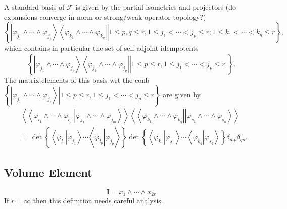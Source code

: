 \documentclass[aps,preprint]{revtex4}%
\begin{document}
A standard basis of $\mathcal{F}$ is given by the partial isometries and
projectors (do expansions converge in norm or strong/weak operator topology?)
\begin{equation}
\left\{  \left.  \left\vert \varphi_{j_{1}}\wedge\cdots\wedge\varphi_{j_{p}%
}\right\rangle \left\langle \varphi_{k_{1}}\wedge\cdots\wedge\varphi_{k_{q}%
}\right\vert \right\vert 1\leq p,q\leq r,1\leq j_{1}<\cdots<j_{p}\leq r;1\leq
k_{1}<\cdots<k_{q}\leq r\right\}  ,
\end{equation}
which contains in particular the set of self adjoint idempotents
\begin{equation}
\left\{  \left.  \left\vert \varphi_{j_{1}}\wedge\cdots\wedge\varphi_{j_{p}%
}\right\rangle \left\langle \varphi_{j_{1}}\wedge\cdots\wedge\varphi_{j_{p}%
}\right\vert \right\vert 1\leq p\leq r,1\leq j_{1}<\cdots<j_{p}\leq
r.\right\}  .
\end{equation}
The matrix elements of this basis wrt the conb $\left\{  \left.  \left\vert
\varphi_{j_{1}}\wedge\cdots\wedge\varphi_{j_{p}}\right\rangle \right\vert
1\leq p\leq r,1\leq j_{1}<\cdots<j_{p}\leq r\right\}  $ are given by
\begin{align}
&  \left\langle \left\langle \varphi_{l_{1}}\wedge\cdots\wedge\varphi_{l_{p}%
}\right\vert \left\vert \varphi_{j_{1}}\wedge\cdots\wedge\varphi_{j_{m}%
}\right\rangle \right\rangle \left\langle \left\langle \varphi_{k_{1}}%
\wedge\cdots\wedge\varphi_{k_{q}}\right\vert \left\vert \varphi_{s_{1}}%
\wedge\cdots\wedge\varphi_{s_{n}}\right\rangle \right\rangle \nonumber\\
&  =\det\left\{  \left\langle \varphi_{l_{1}}\left\vert \varphi_{j_{1}%
}\right.  \right\rangle \cdots\left\langle \varphi_{l_{p}}\left\vert
\varphi_{j_{p}}\right.  \right\rangle \right\}  \det\left\{  \left\langle
\varphi_{k_{1}}\left\vert \varphi_{s_{1}}\right.  \right\rangle \cdots
\left\langle \varphi_{k_{q}}\left\vert \varphi_{s_{q}}\right.  \right\rangle
\right\}  \delta_{mp}\delta_{qn}.
\end{align}


\subsection{Volume Element}%

\begin{equation}
\mathbf{I}=x_{1}\wedge\cdots\wedge x_{2r}%
\end{equation}
If $r=\infty$ then this definition needs careful analysis.
\end{document}
